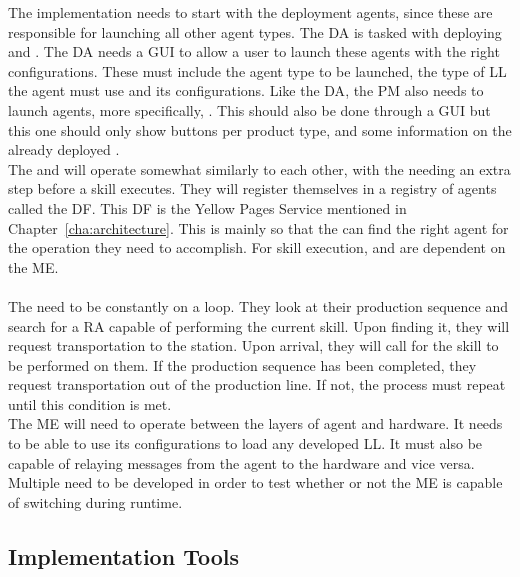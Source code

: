 The implementation needs to start with the deployment agents, since these are responsible for launching all other agent types. The \acrfull{DA} is tasked with deploying  and . The \acrshort{DA} needs a \acrfull{GUI} to allow a user to launch these agents with the right configurations. These must include the agent type to be launched, the type of \acrlong{LL} the agent must use and its configurations. Like the \acrshort{DA}, the \acrfull{PM} also needs to launch agents, more specifically, . This should also be done through a \acrshort{GUI} but this one should only show buttons per product type, and some information on the already deployed .\\

The  and  will operate somewhat similarly to each other, with the  needing an extra step before a skill executes. They will register themselves in a registry of agents called the \acrfull{DF}. This \acrshort{DF} is the Yellow Pages Service mentioned in Chapter~\ref{cha:architecture}. This is mainly so that the  can find the right agent for the operation they need to accomplish. For skill execution,  and  are dependent on the \acrlong{ME}.\\\\

The  need to be constantly on a loop. They look at their production sequence and search for a \acrshort{RA} capable of performing the current skill. Upon finding it, they will request transportation to the station. Upon arrival, they will call for the skill to be performed on them. If the production sequence has been completed, they request transportation out of the production line. If not, the process must repeat until this condition is met.\\

The \acrlong{ME} will need to operate between the layers of agent and hardware. It needs to be able to use its configurations to load any developed \acrlong{LL}. It must also be capable of relaying messages from the agent to the hardware and vice versa. Multiple  need to be developed in order to test whether or not the \acrshort{ME} is capable of switching  during runtime.\\

\subsection{Implementation Tools}
\label{subsec:implementation_tools}

